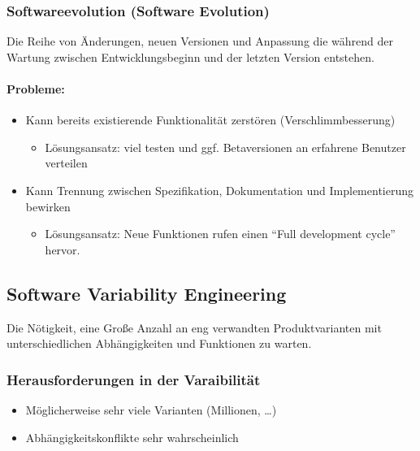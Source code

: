 \documentclass[
    ngerman,
    color=3b,
    summary,
    boxarc,
    main,
]{rubos-tuda-template}
\begin{document}
\subsubsection{Softwareevolution (Software Evolution)}
\begin{definition}[Softwareevolution]
    Die Reihe von Änderungen, neuen Versionen und Anpassung die während der Wartung zwischen Entwicklungsbeginn und der letzten Version entstehen.
\end{definition}
\paragraph{Probleme:}\begin{itemize}
    \item Kann bereits existierende Funktionalität zerstören (Verschlimmbesserung)\begin{itemize}
              \item Lösungsansatz: viel testen und ggf. Betaversionen an erfahrene Benutzer verteilen
          \end{itemize}
    \item Kann Trennung zwischen Spezifikation, Dokumentation und Implementierung bewirken\begin{itemize}
              \item Lösungsansatz: Neue Funktionen rufen einen \enquote{Full development cycle} hervor.
          \end{itemize}
\end{itemize}
\subsection{Software Variability Engineering}
\begin{definition}
    Die Nötigkeit, eine Große Anzahl an eng verwandten Produktvarianten mit unterschiedlichen Abhängigkeiten und Funktionen zu warten.
\end{definition}

\subsubsection{Herausforderungen in der Varaibilität}\begin{itemize}
    \item Möglicherweise sehr viele Varianten (Millionen, \dots)
    \item Abhängigkeitskonflikte sehr wahrscheinlich
\end{itemize}
\end{document}

